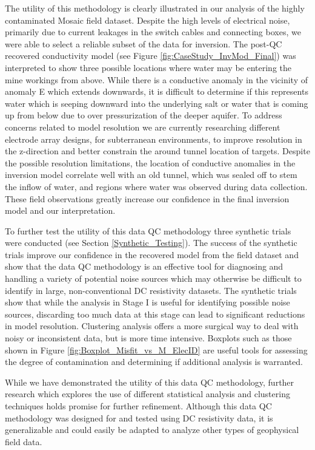 \documentclass[final,authoryear,5p,times,twocolumn]{elsarticle}
\begin{document}
The utility of this methodology is clearly illustrated in our analysis of the highly contaminated Mosaic field dataset. Despite the high levels of electrical noise, primarily due to current leakages in the switch cables and connecting boxes, we were able to select a reliable subset of the data for inversion. The post-QC recovered conductivity model (see Figure \ref{fig:CaseStudy_InvMod_Final}) was interpreted to show three possible locations where water may be entering the mine workings from above. While there is a conductive anomaly in the vicinity of anomaly E which extends downwards, it is difficult to determine if this represents water which is seeping downward into the underlying salt or water that is coming up from below due to over pressurization of the deeper aquifer. To address concerns related to model resolution we are currently researching different electrode array designs, for subterranean environments, to improve resolution in the z-direction and better constrain the around tunnel location of targets. Despite the possible resolution limitations, the location of conductive anomalies in the inversion model correlate well with an old tunnel, which was sealed off to stem the inflow of water, and regions where water was observed during data collection. These field observations greatly increase our confidence in the final inversion model and our interpretation.

To further test the utility of this data QC methodology three synthetic trials were conducted (see Section \ref{Synthetic_Testing}). The success of the synthetic trials improve our confidence in the recovered model from the field dataset and show that the data QC methodology is an effective tool for diagnosing and handling a variety of potential noise sources which may otherwise be difficult to identify in large, non-conventional DC resistivity datasets. The synthetic trials show that while the analysis in Stage I is useful for identifying possible noise sources, discarding too much data at this stage can lead to significant reductions in model resolution. Clustering analysis offers a more surgical way to deal with noisy or inconsistent data, but is more time intensive. Boxplots such as those shown in Figure \ref{fig:Boxplot_Misfit_vs_M_ElecID} are useful tools for assessing the degree of contamination and determining if additional analysis is warranted.

While we have demonstrated the utility of this data QC methodology, further research which explores the use of different statistical analysis and clustering techniques holds promise for further refinement. Although this data QC methodology was designed for and tested using DC resistivity data, it is generalizable and could easily be adapted to analyze other types of geophysical field data.
\end{document}
